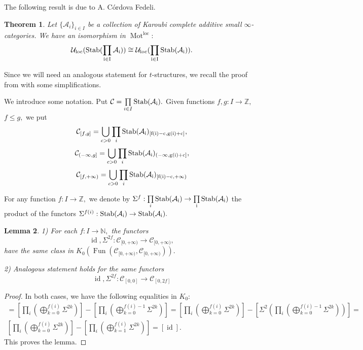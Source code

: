 \documentclass[11pt,leqno]{amsart}
\newtheorem{theo}{Theorem}[section]
\newtheorem{lemma}[theo]{Lemma}
\numberwithin{equation}{section}
\def\N{\mathbb{N}}
\def\Z{\mathbb{Z}}
\newcommand{\prodd}[1][]{\mathop{\prod}\limits_{#1}}
\newcommand{\Mot}{\operatorname{Mot}}
\newcommand{\loc}{\operatorname{loc}}
\newcommand{\cA}{{\mathcal A}}
\newcommand{\cC}{{\mathcal C}}
\newcommand{\cU}{{\mathcal U}}
\newcommand{\Fun}{\operatorname{Fun}}
\newcommand{\Stab}{\rm Stab}
\newcommand{\id}{\operatorname{id}}
\begin{document}
The following result is due to A. C\'ordova Fedeli.

\begin{theo}\label{th:Cordova_U_loc}\cite[Proposition 2.10]{Cor} Let $\{\cA_i\}_{i\in I}$ be a collection of Karoubi complete additive small $\infty$-categories. We have an isomorphism in $\Mot^{\loc}:$
$$\cU_{\loc}(\Stab(\prodd[i\in I]\cA_i))\cong \cU_{\loc}(\prodd[i\in I]\Stab(\cA_i)).$$\end{theo}

Since we will need an analogous statement for $t$-structures, we recall the proof from \cite{Cor} with some simplifications.

We introduce some notation. Put $\cC=\prodd[i\in I]\Stab(\cA_i).$ Given functions $f,g:I\to\Z,$ $f\leq g,$ we put \begin{equation}\label{eq:C_f_g}\cC_{[f,g]}=\bigcup\limits_{c>0}\prod\limits_i \Stab(\cA_i)_{[f(i)-c,g(i)+c]},\end{equation}
\begin{equation}\label{eq:C_-infty_g}\cC_{(-\infty,g]}=\bigcup\limits_{c>0}\prod\limits_i \Stab(\cA_i)_{(-\infty,g(i)+c]},\end{equation}
\begin{equation}\label{eq:C_f_+infty}\cC_{[f,+\infty)}=\bigcup\limits_{c>0}\prod\limits_i \Stab(\cA_i)_{[f(i)-c,+\infty)}\end{equation}

For any function $f:I\to\Z,$ we denote by $\Sigma^f:\prod\limits_i \Stab(\cA_i)\to \prod\limits_i \Stab(\cA_i)$ the product of the functors $\Sigma^{f(i)}:\Stab(\cA_i)\to \Stab(\cA_i).$

\begin{lemma}\label{lem:functors_with_same_class}\cite[Lemma 2.9]{Cor} 1) For each $f:I\to\N,$ the functors $$\id,\Sigma^{2f}:\cC_{[0,+\infty)}\to \cC_{[0,+\infty)},$$
have the same class in $K_0(\Fun(\cC_{[0,+\infty)},\cC_{[0,+\infty)})).$

2) Analogous statement holds for the same functors
$$\id,\Sigma^{2f}:\cC_{[0,0]}\to \cC_{[0,2f]}$$
\end{lemma}

\begin{proof}In both cases, we have the following equalities in $K_0:$
\begin{multline*}[\Sigma^{2f}]=[\prod\limits_i (\bigoplus\limits_{k=0}^{f(i)}\Sigma^{2k})]-[\prod\limits_i (\bigoplus\limits_{k=0}^{f(i)-1}\Sigma^{2k})]=[\prod\limits_i (\bigoplus\limits_{k=0}^{f(i)}\Sigma^{2k})]-[\Sigma^2(\prod\limits_i (\bigoplus\limits_{k=0}^{f(i)-1}\Sigma^{2k}))]=\\ [\prod\limits_i (\bigoplus\limits_{k=0}^{f(i)}\Sigma^{2k})]-[\prod\limits_i (\bigoplus\limits_{k=1}^{f(i)}\Sigma^{2k})]=[\id].\end{multline*}This proves the lemma.\end{proof}
\end{document}
